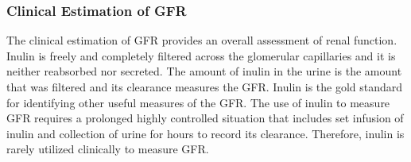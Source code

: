 


\subsubsection{Clinical Estimation of GFR}

The clinical estimation of GFR provides an overall assessment of renal function. Inulin is freely and completely filtered across the glomerular capillaries and it is neither reabsorbed nor secreted. The amount of inulin in the urine is the amount that was filtered and its clearance measures the GFR. Inulin is the gold standard for identifying other useful measures of the GFR. The use of inulin to measure GFR requires a prolonged highly controlled situation that includes set infusion of inulin and collection of urine for hours to record its clearance. Therefore, inulin is rarely utilized clinically to measure GFR.

